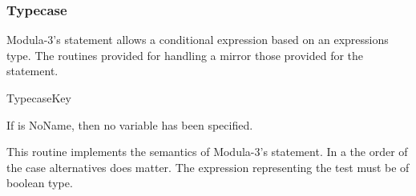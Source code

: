 \subsubsection{Typecase}
Modula-3's  statement allows a conditional expression
based on an expressions type.  The routines provided for handling a
 mirror those provided for the  statement.

	{}{TypecaseKey}
\begin{functionality}
If  is NoName, then no variable has been specified.
\end{functionality}
\begin{functionality}
\end{functionality}


\begin{functionality}
\end{functionality}
\begin{functionality}
This routine implements the semantics of Modula-3's 
statement.  In a  the order of the case alternatives
does matter.
The expression representing the test must be of boolean type.
\end{functionality}




